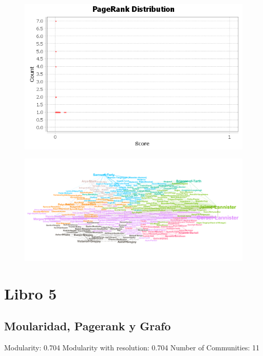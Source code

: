 \documentclass[]{article}
\begin{document}
\begin{figure}[htbp]  
\centering
\includegraphics{prb4/pageranks.png}
\end{figure}

\begin{figure}[htbp]  
\centering
\includegraphics{b4.png}
\end{figure}\newpage

\section{Libro 5}\label{libro-5}

\subsection{Moularidad, Pagerank y
Grafo}\label{moularidad-pagerank-y-grafo-4}

Modularity: 0.704 Modularity with resolution: 0.704 Number of
Communities: 11
\end{document}
